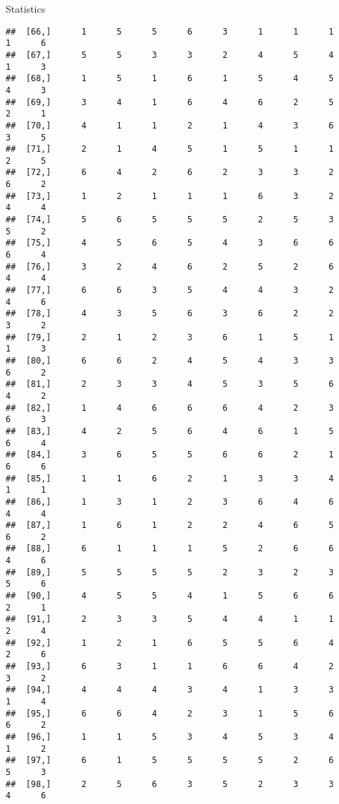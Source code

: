 \documentclass[
  ignorenonframetext,
]{beamer}
\begin{document}
\begin{frame}[fragile]{Statistics}
\begin{verbatim}
##  [66,]      1      5      5      6      3      1      1      1      1      6
##  [67,]      5      5      3      3      2      4      5      4      1      3
##  [68,]      1      5      1      6      1      5      4      5      4      3
##  [69,]      3      4      1      6      4      6      2      5      2      1
##  [70,]      4      1      1      2      1      4      3      6      3      5
##  [71,]      2      1      4      5      1      5      1      1      2      5
##  [72,]      6      4      2      6      2      3      3      2      6      2
##  [73,]      1      2      1      1      1      6      3      2      4      4
##  [74,]      5      6      5      5      5      2      5      3      5      2
##  [75,]      4      5      6      5      4      3      6      6      6      4
##  [76,]      3      2      4      6      2      5      2      6      4      4
##  [77,]      6      6      3      5      4      4      3      2      4      6
##  [78,]      4      3      5      6      3      6      2      2      3      2
##  [79,]      2      1      2      3      6      1      5      1      1      3
##  [80,]      6      6      2      4      5      4      3      3      6      2
##  [81,]      2      3      3      4      5      3      5      6      4      2
##  [82,]      1      4      6      6      6      4      2      3      6      3
##  [83,]      4      2      5      6      4      6      1      5      6      4
##  [84,]      3      6      5      5      6      6      2      1      6      6
##  [85,]      1      1      6      2      1      3      3      4      1      1
##  [86,]      1      3      1      2      3      6      4      6      4      4
##  [87,]      1      6      1      2      2      4      6      5      6      2
##  [88,]      6      1      1      1      5      2      6      6      4      6
##  [89,]      5      5      5      5      2      3      2      3      5      6
##  [90,]      4      5      5      4      1      5      6      6      2      1
##  [91,]      2      3      3      5      4      4      1      1      2      4
##  [92,]      1      2      1      6      5      5      6      4      2      6
##  [93,]      6      3      1      1      6      6      4      2      3      2
##  [94,]      4      4      4      3      4      1      3      3      1      4
##  [95,]      6      6      4      2      3      1      5      6      6      2
##  [96,]      1      1      5      3      4      5      3      4      1      2
##  [97,]      6      1      5      5      5      5      2      6      5      3
##  [98,]      2      5      6      3      5      2      3      3      4      6

\end{verbatim}
\end{frame}
\end{document}
